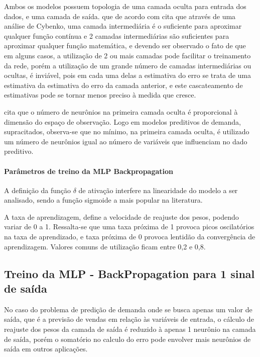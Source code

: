 \documentclass[	12pt, Times, openright, twoside, a4paper, english, brazil]{abntex2}
\begin{document}
            Ambos os modelos possuem topologia de uma camada oculta para entrada dos dados, e uma camada de saída. que de acordo com \cite{Braga2000} cita que através de uma análise de Cybenko, uma camada intermediária é o suficiente para aproximar qualquer função contínua e 2 camadas intermediárias são suficientes para aproximar qualquer função matemática, e devendo ser observado o fato de que em alguns casos, a utilização de 2 ou mais camadas pode facilitar o treinamento da rede, porém a utilização de um grande número de camadas intermediárias ou ocultas, é inviável, pois em cada uma delas a estimativa do erro se trata de uma estimativa da estimativa do erro da camada anterior, e este cascateamento de estimativas pode se tornar menos preciso à medida que cresce.
            
            \cite{Flavia2014} cita que o número de neurônios na primeira camada oculta é proporcional à dimensão do espaço de observação. Logo em modelos preditivos de demanda, supracitados, observa-se que no mínimo, na primeira camada oculta, é utilizado um número de neurônios igual ao número de variáveis que influenciam no dado preditivo.
            
            \paragraph*{Parâmetros de treino da MLP Backpropagation}
            A definição da função $\delta$ de ativação interfere na linearidade  do modelo a ser analisado, sendo a função sigmoide a mais popular na literatura. 
            
            A taxa de aprendizagem, define a velocidade de reajuste dos pesos, podendo variar de 0 a 1. Ressalta-se que uma taxa próxima de 1 provoca picos oscilatórios na taxa de aprendizado, e taxa próxima de 0 provoca lentidão da convergência de aprendizagem. Valores comuns de utilização ficam entre 0,2 e 0,8.
        
        \subsection{Treino da MLP - BackPropagation para 1 sinal de saída}
            No caso do problema de predição de demanda onde se busca apenas um valor de saída, que é a previsão de vendas em relação às variáveis de entrada, o cálculo de reajuste dos pesos da camada de saída é reduzido à apenas 1 neurônio na camada de saída, porém o somatório no calculo do erro pode envolver mais neurônios de saída em outros aplicações.
            
\end{document}
